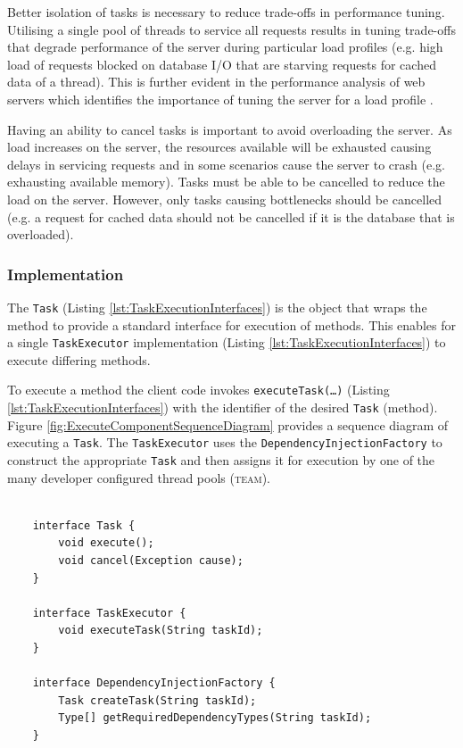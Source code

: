 \documentclass[prodmode]{style/acmlarge}
\begin{document}
Better isolation of tasks is necessary to reduce trade-offs in performance
tuning.  Utilising a single pool of threads to service all requests results in
tuning trade-offs that degrade performance of the server during particular load
profiles (e.g. high load of requests blocked on database I/O that are starving
requests for cached data of a thread).  This is further evident in the
performance analysis of web servers which identifies the importance of tuning
the server for a load profile
\cite{tuning-important,low-server-footprint,tuning-os-important}.

Having an ability to cancel tasks is important to avoid overloading the server. 
As load increases on the server, the resources available will be exhausted
causing delays in servicing requests and in some scenarios cause the server to
crash (e.g. exhausting available memory).  Tasks must be able to be cancelled to
reduce the load on the server.  However, only tasks causing bottlenecks should
be cancelled (e.g. a request for cached data should not be cancelled if it is
the database that is overloaded).


\subsubsection*{Implementation}

The \texttt{Task} (Listing \ref{lst:TaskExecutionInterfaces}) is the object that wraps
the method to provide a standard interface for execution of methods.  This
enables for a single \texttt{TaskExecutor} implementation (Listing
\ref{lst:TaskExecutionInterfaces}) to execute differing methods.

To execute a method the client code invokes \texttt{executeTask(\ldots)}
(Listing \ref{lst:TaskExecutionInterfaces}) with the identifier of the desired
\texttt{Task} (method).  Figure \ref{fig:ExecuteComponentSequenceDiagram}
provides a sequence diagram of executing a \texttt{Task}.  The
\texttt{TaskExecutor} uses the \texttt{DependencyInjectionFactory} to construct
the appropriate \texttt{Task} and then assigns it for execution by one of the
many developer configured thread pools (\textsc{team}).

\begin{lstlisting}[float,label=lst:TaskExecutionInterfaces]

    interface Task {
        void execute(); 
        void cancel(Exception cause);
    }

    interface TaskExecutor {
        void executeTask(String taskId);
    }

    interface DependencyInjectionFactory {
        Task createTask(String taskId);
        Type[] getRequiredDependencyTypes(String taskId);
    }
\end{lstlisting}
\end{document}
